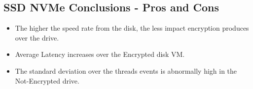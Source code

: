\subsection{SSD NVMe Conclusions - Pros and Cons}
\begin{itemize}
  \item The higher the speed rate from the disk, the less impact encryption produces over the drive.
  \item Average Latency increases over the Encrypted disk VM.
  \item The standard deviation over the threads events is abnormally high in the Not-Encrypted drive.
\end{itemize}
